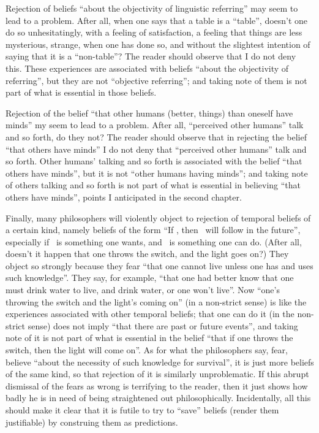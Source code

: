 Rejection of beliefs \enquote{about the objectivity of linguistic referring} may 
seem to lead to a problem. After all, when one says that a table is a \enquote{table}, 
doesn't one do so unhesitatingly, with a feeling of satisfaction, a feeling that 
things are less mysterious, strange, when one has done so, and without the 
slightest intention of saying that it is a \enquote{non-table}? The reader should 
observe that I do not deny this. These experiences are associated with beliefs 
\enquote{about the objectivity of referring}, but they are not \enquote{objective referring}; 
and taking note of them is not part of what is essential in those beliefs. 

Rejection of the belief \enquote{that other humans (better, things) than oneself 
have minds} my seem to lead to a problem. After all, \enquote{perceived other 
humans} talk and so forth, do they not? The reader should observe that in 
rejecting the belief \enquote{that others have minds} I do not deny that \enquote{perceived 
other humans} talk and so forth. Other humans' talking and so forth is 
associated with the belief \enquote{that others have minds}, but it is not \enquote{other 
humans having minds}; and taking note of others talking and so forth is not 
part of what is essential in believing \enquote{that others have minds}, points I 
anticipated in the second chapter. 

Finally, many philosophers will violently object to rejection of 
temporal beliefs of a certain kind, namely beliefs of the form \enquote{If \x, then \y\ 
will follow in the future}, especially if \y\ is something one wants, and \x\ is 
something one can do. (After all, doesn't it happen that one throws the 
switch, and the light goes on?) They object so strongly because they fear 
\enquote{that one cannot live unless one has and uses such knowledge}. They say, 
for example, \enquote{that one had better know that one must drink water to live, 
and drink water, or one won't live}. Now \enquote{one's throwing the switch and the 
light's coming on} (in a non-strict sense) is like the experiences associated 
with other temporal beliefs; that one can do it (in the non-strict sense) does 
not imply \enquote{that there are past or future events}, and taking note of it is not 
part of what is essential in the belief \enquote{that if one throws the switch, then the 
light will come on}. As for what the philosophers say, fear, believe \enquote{about 
the necessity of such knowledge for survival}, it is just more beliefs of the 
same kind, so that rejection of it is similarly unproblematic. If this abrupt 
dismissal of the fears as wrong is terrifying to the reader, then it just shows 
how badly he is in need of being straightened out philosophically. 
Incidentally, all this should make it clear that it is futile to try to \enquote{save} 
beliefs (render them justifiable) by construing them as predictions. 

